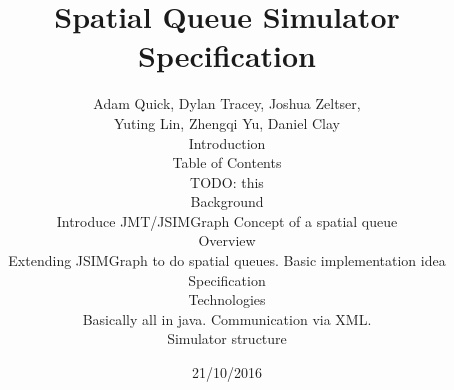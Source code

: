 \documentclass[a4paper]{article}
\begin{document}
\title{Spatial Queue Simulator Specification}
\date{21/10/2016}
\author{Adam Quick, Dylan Tracey, Joshua Zeltser, \\Yuting Lin, Zhengqi Yu, Daniel Clay
\maketitle

\section{Introduction}

\subsection{Table of Contents}%

TODO: this

\subsection{Background}%

Introduce JMT/JSIMGraph
Concept of a spatial queue

\subsection{Overview}%

Extending JSIMGraph to do spatial queues. Basic implementation idea

\section{Specification}

\subsection{Technologies}%

Basically all in java. Communication via XML.

\subsection{Simulator structure}%

}
\end{document}
